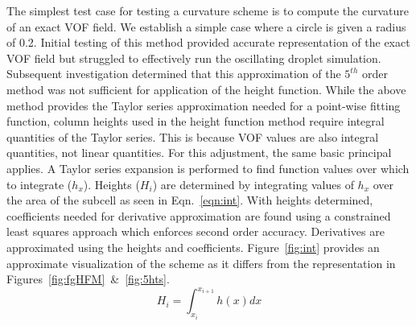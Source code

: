 The simplest test case for testing a curvature scheme is to compute the curvature of an exact VOF field. We establish a simple case where a circle is given a radius of 0.2. Initial testing of this method provided accurate representation of the exact VOF field but struggled to effectively run the oscillating droplet simulation. Subsequent investigation determined that this approximation of the $5^{th}$ order method was not sufficient for application of the height function. While the above method provides the Taylor series approximation needed for a point-wise fitting function, column heights used in the height function method require integral quantities of the Taylor series. This is because VOF values are also integral quantities, not linear quantities. For this adjustment, the same basic principal applies. A Taylor series expansion is performed to find function values over which to integrate ($h_x$). Heights ($H_i$) are determined by integrating values of $h_x$ over the area of the subcell as seen in Eqn.~\ref{eqn:int}. With heights determined, coefficients needed for derivative approximation are found using a constrained least squares approach which enforces second order accuracy. Derivatives are approximated using the heights and coefficients. Figure~\ref{fig:int} provides an approximate visualization of the scheme as it differs from the representation in Figures~\ref{fig:fgHFM}~\&~\ref{fig:5hts}.
\begin{equation}
H_i = \int_{x_i}^{x_{i+1}} h(x) dx
\label{eqn:int}
\end{equation}
